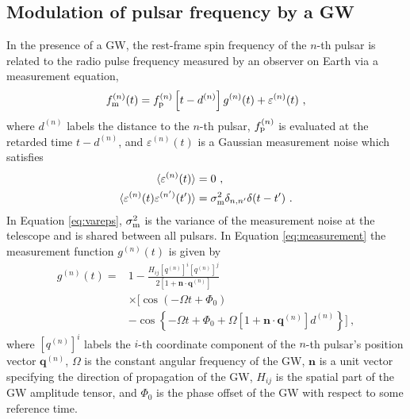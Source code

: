 \documentclass[fleqn,usenatbib,useAMS]{mnras}
\begin{document}
\subsection{Modulation of pulsar frequency by a GW} \label{sec:psr_measured}
In the presence of a GW, the rest-frame spin frequency of the $n$-th pulsar is related to the radio pulse frequency measured by an observer on Earth via a measurement equation,
\begin{equation}
	f_{\rm m}^{(n)}(t) = f_{\rm p}^{(n)}\left [t-d^{(n)} \right ] g^{(n)}(t) +  \varepsilon^{(n)}(t)\ ,
	\label{eq:measurement}
\end{equation}
where $d^{(n)}$ labels the distance to the $n$-th pulsar, $f_{\rm p}^{(n)}$ is evaluated at the retarded time $t-d^{(n)}$, and $\varepsilon^{(n)}(t)$ is a Gaussian measurement noise which satisfies 
\begin{align}
	\langle \varepsilon^{(n)}(t) \rangle &= 0 \ , \\
	\langle \varepsilon^{(n)}(t) \varepsilon^{(n')}(t') \rangle &= \sigma_{\rm m}^2 \delta_{n,n'} \delta(t - t') \ .	\label{eq:vareps}
\end{align}
In Equation \eqref{eq:vareps}, $\sigma_{\rm m}^2$ is the variance of the measurement noise at the telescope and is shared between all pulsars. In Equation \eqref{eq:measurement} the measurement function $g^{(n)}(t)$ is given by \citep[e.g.][]{Maggiore}
\begin{align}
	g^{(n)}(t) =& 1 - \frac{ H_{ij}[q^{(n)}]^i [q^{(n)}]^j }{2 [1 + \boldsymbol{n}\cdot \boldsymbol{q}^{(n)}] } \nonumber \\
	& \times \Big[\cos\left(-\Omega t +\Phi_0\right) \nonumber \\
	&- \cos \left \{-\Omega t +\Phi_0 + \Omega \left[1 + \boldsymbol{n}\cdot \boldsymbol{q}^{(n)} \right]  d^{(n)} \right \} \Big ] \ ,
	\label{eq:g_func_trig}
\end{align}
where $[q^{(n)}]^i$ labels the $i$-th coordinate component of the $n$-th pulsar's position vector $\boldsymbol{q}^{(n)}$, $\Omega$ is the constant angular frequency of the GW, $\boldsymbol{n}$ is a unit vector specifying the direction of propagation of the GW, $H_{ij}$ is the spatial part of the GW amplitude tensor, and $\Phi_0$ is the phase offset of the GW with respect to some reference time. \newline  
\end{document}

